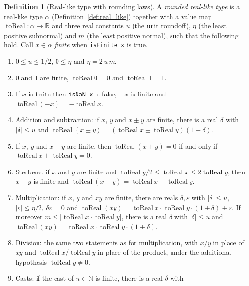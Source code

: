 \documentclass[11pt,a4paper]{article}
\theoremstyle{definition}
\newtheorem{definition}{Definition}
\theoremstyle{plain}
\theoremstyle{remark}
\newcommand{\R}{\mathbb{R}}
\newcommand{\N}{\mathbb{N}}
\newcommand{\code}[1]{\texttt{#1}}
\begin{document}
\begin{definition}[Real-like type with rounding laws]\label{def:rounded_real}
A \emph{rounded real-like type} is a real-like type $\alpha$ (Definition~\ref{def:real_like})
together with a value map $\operatorname{toReal} : \alpha \to \R$ and three real constants
$u$ (the unit roundoff), $\eta$ (the least positive subnormal) and $m$ (the least positive
normal), such that the following hold. Call $x \in \alpha$ \emph{finite} when
\code{isFinite x} is true.
\begin{enumerate}
\item $0 \le u \le 1/2$, $0 \le \eta$ and $\eta = 2\,u\,m$.
\item $0$ and $1$ are finite, $\operatorname{toReal} 0 = 0$ and $\operatorname{toReal} 1 = 1$.
\item If $x$ is finite then \code{isNaN x} is false, $-x$ is finite and
$\operatorname{toReal}(-x) = -\operatorname{toReal} x$.
\item Addition and subtraction: if $x$, $y$ and $x \pm y$ are finite, there is a real $\delta$
with $|\delta| \le u$ and
$\operatorname{toReal}(x \pm y) = (\operatorname{toReal} x \pm \operatorname{toReal} y)(1 + \delta)$.
\item If $x$, $y$ and $x + y$ are finite, then $\operatorname{toReal}(x + y) = 0$ if and only
if $\operatorname{toReal} x + \operatorname{toReal} y = 0$.
\item Sterbenz: if $x$ and $y$ are finite and
$\operatorname{toReal} y / 2 \le \operatorname{toReal} x \le 2 \operatorname{toReal} y$, then
$x - y$ is finite and
$\operatorname{toReal}(x - y) = \operatorname{toReal} x - \operatorname{toReal} y$.
\item Multiplication: if $x$, $y$ and $x y$ are finite, there are reals $\delta, \varepsilon$
with $|\delta| \le u$, $|\varepsilon| \le \eta / 2$, $\delta \varepsilon = 0$ and
$\operatorname{toReal}(x y) = \operatorname{toReal} x \cdot \operatorname{toReal} y \cdot (1 + \delta) + \varepsilon$.
If moreover $m \le |\operatorname{toReal} x \cdot \operatorname{toReal} y|$, there is a real
$\delta$ with $|\delta| \le u$ and
$\operatorname{toReal}(x y) = \operatorname{toReal} x \cdot \operatorname{toReal} y \cdot (1 + \delta)$.
\item Division: the same two statements as for multiplication, with $x / y$ in place of $x y$
and $\operatorname{toReal} x / \operatorname{toReal} y$ in place of the product, under the
additional hypothesis $\operatorname{toReal} y \ne 0$.
\item Casts: if the cast of $n \in \N$ is finite, there is a real $\delta$ with

\end{enumerate}
\end{definition}
\end{document}
